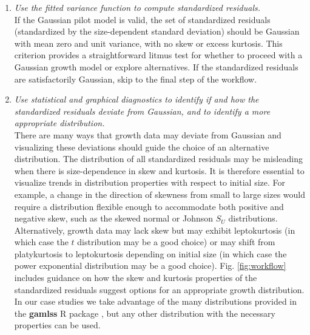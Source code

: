 \documentclass[11pt]{article}
\newcommand{\tom}[2]{{\color{red}{#1}}\footnote{\textit{\color{red}{#2}}}}
\begin{document}
{\begin{enumerate}
Allowing non-constant variance means that it is not necessary to transform the data 
in a way that stabilizes the growth variance. 
Transformation remains an option when it does not create new problems (\tom{discussed later}{I think we will need to talk about the beta regression approach in the Discussion, and that could be a place to give an example of `new problems'.}), and it may have advantages besides variance stabilization.
In particular log-transformation is often appropriate for size data \citep{ellner-etal-2016}, and it helps avoid eviction at small sizes. 

\item \textit{Use the fitted variance function to compute standardized residuals.}
\\
If the Gaussian pilot model is valid, the set of standardized residuals (standardized by the size-dependent standard deviation) should be Gaussian with mean zero and unit variance, with no skew or excess kurtosis. 
This criterion provides a straightforward litmus test for whether to proceed with a Gaussian growth model or explore alternatives. 
If the standardized residuals are satisfactorily Gaussian, skip to the final step of the workflow. 

\item \textit{Use statistical and graphical diagnostics to identify if and how the standardized residuals deviate from Gaussian, and to identify a more appropriate distribution.}
\\
There are many ways that growth data may deviate from Gaussian and visualizing these deviations should guide the choice of an alternative distribution. 
The distribution of all standardized residuals may be misleading when there is size-dependence in skew and kurtosis. 
It is therefore essential to visualize trends in distribution properties with respect to initial size. 
For example, a change in the direction of skewness from small to large sizes would require a distribution flexible enough to accommodate both positive and negative skew, such as the skewed normal or Johnson $S_{U}$ distributions. 
Alternatively, growth data may lack skew but may exhibit leptokurtosis (in which case the $t$ distribution may be a good choice) or may shift from platykurtosis to leptokurtosis depending on initial size (in which case the power exponential distribution may be a good choice). 
Fig. \ref{fig:workflow} includes guidance on how the skew and kurtosis properties of the standardized residuals suggest options for 
an appropriate growth distribution. In our case studies we take advantage of the many distributions provided in the \textbf{gamlss} R package \citep{stasinopoulos2007generalized}, but any other distribution with the necessary properties can be used.  


\end{enumerate}}
\end{document}
